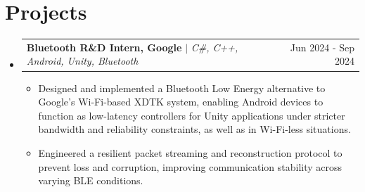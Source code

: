 \documentclass[letterpaper,11pt]{article}
\makeatletter
\newcommand{\resumeItem}[1]{
  \item\small{
    {#1 \vspace{-2pt}}
  }
}
\newcommand{\resumeProjectHeading}[2]{
    \item
    \begin{tabular*}{0.97\textwidth}{l@{\extracolsep{\fill}}r}
      \small#1 & #2 \\
    \end{tabular*}\vspace{-7pt}
}
\newcommand{\resumeSubHeadingListStart}{\begin{itemize}[leftmargin=0.15in, label={}]}
\newcommand{\resumeSubHeadingListEnd}{\end{itemize}}
\newcommand{\resumeItemListStart}{\begin{itemize}}
\newcommand{\resumeItemListEnd}{\end{itemize}\vspace{-5pt}}
\makeatother
\begin{document}
\section{Projects}
    \resumeSubHeadingListStart
    \resumeProjectHeading
          {\textbf{Bluetooth R\&D Intern, Google} $|$ \emph{C\#, C++, Android, Unity, Bluetooth}}{Jun 2024 - Sep 2024}
          \resumeItemListStart
            \resumeItem{Designed and implemented a Bluetooth Low Energy alternative to Google's Wi-Fi-based XDTK system, enabling Android devices to function as low-latency controllers for Unity applications under stricter bandwidth and reliability constraints, as well as in Wi-Fi-less situations.}
            \resumeItem{Engineered a resilient packet streaming and reconstruction protocol to prevent loss and corruption, improving communication stability across varying BLE conditions.}
          \resumeItemListEnd
    

    \resumeSubHeadingListEnd
\end{document}
